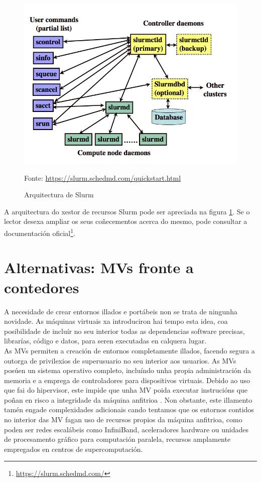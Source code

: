 \begin{figure}
\label{archSingularity}
\centerline{\includegraphics[width=15cm]{figuras/archSingularity.png}}
\caption{Arquitectura de Slurm}
\medskip
\small
\centerline{Fonte: \url{https://slurm.schedmd.com/quickstart.html}}
\end{figure}

A arquitectura do xestor de recursos Slurm pode ser apreciada na figura \ref{archSingularity}. Se o lector desexa ampliar os seus coñecementos acerca do mesmo, pode consultar a documentación oficial\footnote{\url{https://slurm.schedmd.com/}}.

\section{Alternativas: \gls{MV}s fronte a contedores}

A necesidade de crear entornos illados e portábeis non se trata de ningunha novidade. As máquinas virtuais xa introduciron hai tempo esta idea, coa posibilidade de incluír no seu interior todas as dependencias software precisas, librarías, código e datos, para seren executadas en calquera lugar.\\

As \gls{MV}s permiten a creación de entornos completamente illados, facendo segura a outorga de privilexios de superusuario no seu interior aos usuarios. As \gls{MV}s posúen un sistema operativo completo, incluíndo unha propia administración da memoria e a emprega de controladores para dispositivos virtuais. Debido ao uso que fai do hipervisor, este impide que unha \gls{MV} poida executar instrucións que poñan en risco a integridade da máquina anfitrioa \cite{introduccionContainerSecurityDocker}. Non obstante, este illamento tamén engade complexidades adicionais cando tentamos que os entornos contidos no interior das \gls{MV} fagan uso de recursos propios da máquina anfitrioa, como poden ser redes escalábeis como InfiniBand, aceleradores hardware \cite{singularityScientificContainers} ou unidades de procesamento gráfico para computación paralela, recursos amplamente empregados en centros de supercomputación.\\

